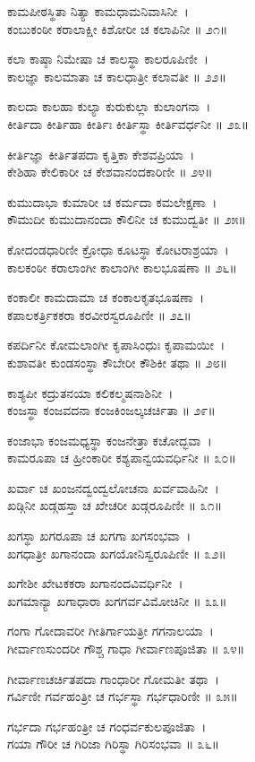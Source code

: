 ಕಾಮಪೀಠಸ್ಥಿತಾ ನಿತ್ಯಾ ಕಾಮಧಾಮನಿವಾಸಿನೀ~।\\
ಕಂಬುಕಂಠೀ ಕರಾಲಾಕ್ಷೀ ಕಿಶೋರೀ ಚ ಕಲಾಪಿನೀ ॥ ೨೧॥

ಕಲಾ ಕಾಷ್ಠಾ ನಿಮೇಷಾ ಚ ಕಾಲಸ್ಥಾ ಕಾಲರೂಪಿಣೀ~।\\
ಕಾಲಜ್ಞಾ ಕಾಲಮಾತಾ ಚ ಕಾಲಧಾತ್ರೀ ಕಲಾವತೀ ॥ ೨೨॥

ಕಾಲದಾ ಕಾಲಹಾ ಕುಲ್ಯಾ ಕುರುಕುಲ್ಲಾ ಕುಲಾಂಗನಾ~।\\
ಕೀರ್ತಿದಾ ಕೀರ್ತಿಹಾ ಕೀರ್ತಿಃ ಕೀರ್ತಿಸ್ಥಾ ಕೀರ್ತಿವರ್ಧನೀ ॥ ೨೩॥

ಕೀರ್ತಿಜ್ಞಾ ಕೀರ್ತಿತಪದಾ ಕೃತ್ತಿಕಾ ಕೇಶವಪ್ರಿಯಾ~।\\
ಕೇಶಿಹಾ ಕೇಲಿಕಾರೀ ಚ ಕೇಶವಾನಂದಕಾರಿಣೀ ॥ ೨೪॥

ಕುಮುದಾಭಾ ಕುಮಾರೀ ಚ ಕರ್ಮದಾ ಕಮಲೇಕ್ಷಣಾ~।\\
ಕೌಮುದೀ ಕುಮುದಾನಂದಾ ಕೌಲಿನೀ ಚ ಕುಮುದ್ವತೀ ॥ ೨೫॥

ಕೋದಂಡಧಾರಿಣೀ ಕ್ರೋಧಾ ಕೂಟಸ್ಥಾ ಕೋಟರಾಶ್ರಯಾ~।\\
ಕಾಲಕಂಠೀ ಕರಾಲಾಂಗೀ ಕಾಲಾಂಗೀ ಕಾಲಭೂಷಣಾ ॥ ೨೬॥

ಕಂಕಾಲೀ ಕಾಮದಾಮಾ ಚ ಕಂಕಾಲಕೃತಭೂಷಣಾ~।\\
ಕಪಾಲಕರ್ತ್ರಿಕಕರಾ ಕರವೀರಸ್ವರೂಪಿಣೀ ॥ ೨೭॥

ಕಪರ್ದಿನೀ ಕೋಮಲಾಂಗೀ ಕೃಪಾಸಿಂಧುಃ ಕೃಪಾಮಯೀ~।\\
ಕುಶಾವತೀ ಕುಂಡಸಂಸ್ಥಾ ಕೌಬೇರೀ ಕೌಶಿಕೀ ತಥಾ ॥ ೨೮॥

ಕಾಶ್ಯಪೀ ಕದ್ರುತನಯಾ ಕಲಿಕಲ್ಮಷನಾಶಿನೀ~।\\
ಕಂಜಸ್ಥಾ ಕಂಜವದನಾ ಕಂಜಕಿಂಜಲ್ಕಚರ್ಚಿತಾ ॥ ೨೯॥

ಕಂಜಾಭಾ ಕಂಜಮಧ್ಯಸ್ಥಾ ಕಂಜನೇತ್ರಾ ಕಚೋದ್ಭವಾ~।\\
ಕಾಮರೂಪಾ ಚ ಹ್ರೀಂಕಾರೀ ಕಶ್ಯಪಾನ್ವಯವರ್ಧಿನೀ ॥ ೩೦॥

ಖರ್ವಾ ಚ ಖಂಜನದ್ವಂದ್ವಲೋಚನಾ ಖರ್ವವಾಹಿನೀ~।\\
ಖಡ್ಗಿನೀ ಖಡ್ಗಹಸ್ತಾ ಚ ಖೇಚರೀ ಖಡ್ಗರೂಪಿಣೀ ॥ ೩೧॥

ಖಗಸ್ಥಾ ಖಗರೂಪಾ ಚ ಖಗಗಾ ಖಗಸಂಭವಾ~।\\
ಖಗಧಾತ್ರೀ ಖಗಾನಂದಾ ಖಗಯೋನಿಸ್ವರೂಪಿಣೀ ॥ ೩೨॥

ಖಗೇಶೀ ಖೇಟಕಕರಾ ಖಗಾನಂದವಿವರ್ಧಿನೀ~।\\
ಖಗಮಾನ್ಯಾ ಖಗಾಧಾರಾ ಖಗಗರ್ವವಿಮೋಚಿನೀ ॥ ೩೩॥

ಗಂಗಾ ಗೋದಾವರೀ ಗೀತಿರ್ಗಾಯತ್ರೀ ಗಗನಾಲಯಾ~।\\
ಗೀರ್ವಾಣಸುಂದರೀ ಗೌಶ್ಚ ಗಾಧಾ ಗೀರ್ವಾಣಪೂಜಿತಾ ॥ ೩೪॥

ಗೀರ್ವಾಣಚರ್ಚಿತಪದಾ ಗಾಂಧಾರೀ ಗೋಮತೀ ತಥಾ~।\\
ಗರ್ವಿಣೀ ಗರ್ವಹಂತ್ರೀ ಚ ಗರ್ಭಸ್ಥಾ ಗರ್ಭಧಾರಿಣೀ ॥ ೩೫॥

ಗರ್ಭದಾ ಗರ್ಭಹಂತ್ರೀ ಚ ಗಂಧರ್ವಕುಲಪೂಜಿತಾ~।\\
ಗಯಾ ಗೌರೀ ಚ ಗಿರಿಜಾ ಗಿರಿಸ್ಥಾ ಗಿರಿಸಂಭವಾ ॥ ೩೬॥

